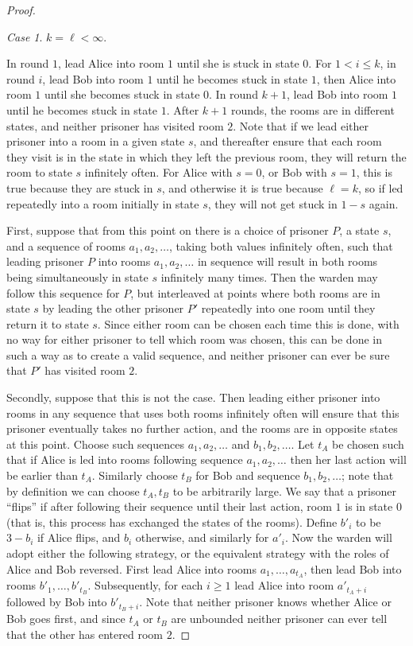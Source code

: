 \documentclass[a4paper,11pt]{extarticle}
\theoremstyle{definition}
\theoremstyle{remark}
\newtheorem{case}{Case}
\begin{document}
\begin{proof}
		\begin{case}$k=\ell<\infty$.\end{case}
		In round $1$, lead Alice into room $1$ until she is stuck in state $0$. For $1<i\leq k$, in round $i$, lead Bob into room $1$ until he becomes stuck in state $1$, then Alice into room $1$ until she becomes stuck in state $0$. In round $k+1$, lead Bob into room $1$ until he becomes stuck in state $1$. After $k+1$ rounds, the rooms are in different states, and neither prisoner has visited room $2$. 
		Note that if we lead either prisoner into a room in a given state $s$, and thereafter ensure that each room they visit is in the state in which they left the previous room, they will return the room to state $s$ infinitely often. For Alice with $s=0$, or Bob with $s=1$, this is true because they are stuck in $s$, and otherwise it is true because $\ell=k$, so if led repeatedly into a room initially in state $s$, they will not get stuck in $1-s$ again.
		
		First, suppose that from this point on there is a choice of prisoner $P$, a state $s$, and a sequence of rooms $a_1,a_2,\ldots$, taking both values infinitely often, such that leading prisoner $P$ into rooms $a_1,a_2,\ldots$ in sequence will result in both rooms being simultaneously in state $s$ infinitely many times. Then the warden may follow this sequence for $P$, but interleaved at points where both rooms are in state $s$ by leading the other prisoner $P'$ repeatedly into one room until they return it to state $s$. Since either room can be chosen each time this is done, with no way for either prisoner to tell which room was chosen, this can be done in such a way as to create a valid sequence, and neither prisoner can ever be sure that $P'$ has visited room $2$.
		
		Secondly, suppose that this is not the case. Then leading either prisoner into rooms in any sequence that uses both rooms infinitely often will ensure that this prisoner eventually takes no further action, and the rooms are in opposite states at this point. Choose such sequences $a_1,a_2,\ldots$ and $b_1,b_2,\ldots$. Let $t_A$ be chosen such that if Alice is led into rooms following sequence $a_1,a_2,\ldots$ then her last action will be earlier than $t_A$. Similarly choose $t_B$ for Bob and sequence $b_1,b_2,\ldots$; note that by definition we can choose $t_A,t_B$ to be arbitrarily large. We say that a prisoner ``flips'' if after following their sequence until their last action, room $1$ is in state $0$ (that is, this process has exchanged the states of the rooms). Define $b'_i$ to be $3-b_i$ if Alice flips, and $b_i$ otherwise, and similarly for $a'_i$. Now the warden will adopt either the following strategy, or the equivalent strategy with the roles of Alice and Bob reversed. First lead Alice into rooms $a_1,\ldots,a_{t_A}$, then lead Bob into rooms $b'_1,\ldots,b'_{t_B}$. Subsequently, for each $i\geq 1$ lead Alice into room $a'_{t_A+i}$ followed by Bob into $b'_{t_B+i}$. Note that neither prisoner knows whether Alice or Bob goes first, and since $t_A$ or $t_B$ are unbounded neither prisoner can ever tell that the other has entered room $2$.
	\end{proof}
	
\end{document}
